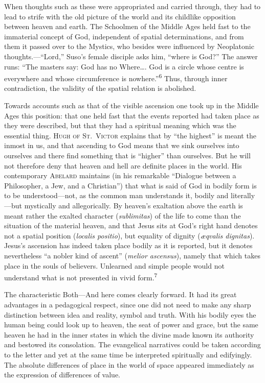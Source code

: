 \documentclass[12pt,a4paper]{book}
\newcommand{\opage}[1]{\marginnote{\footnotesize\textit{[#1]}}}
\begin{document}
When thoughts such as these were appropriated and carried through, they had
to lead to strife with the old picture of the world and its childlike
opposition between heaven and earth. The Schoolmen of the Middle Ages held
fast to the immaterial concept of God, independent of spatial determinations,
and from them it passed over to the Mystics, who besides were influenced by
Neoplatonic thoughts.---``Lord,'' Suso's female disciple asks him, ``where is
God?'' The answer runs: ``The masters say: God has no Where\ldots. God is a
circle whose centre is everywhere and whose circumference is
nowhere.''\textsuperscript{6} Thus, through inner contradiction, the validity
of the spatial relation is abolished.

Towards accounts such as that of the visible ascension one took up in the
Middle Ages this position: that one held fast that the events reported had
taken place as they were described, but that they had a spiritual meaning
which was the essential thing. \textsc{Hugh of St.\ Victor} explains that by
``the highest'' is meant the inmost in us, and that ascending to God means
that we sink ourselves into ourselves and there find something that is
``higher'' than ourselves. But he will not therefore deny that heaven and hell
are definite places in the world. His contemporary \textsc{Abelard} maintains
(in his remarkable ``Dialogue between a Philosopher, a Jew, and a Christian'')
that what is said of God in bodily form is to be understood---not, as the
common man understands it, bodily and literally---but mystically and
allegorically. By heaven's exaltation above the earth is meant rather the
exalted character (\textit{sublimitas}) of the life to come than the situation
of the material heaven, and that Jesus sits at God's right hand denotes not a
spatial position (\textit{localis positio}), but equality of dignity
(\textit{æqvalis dignitas}). Jesus's ascension has indeed taken place bodily
as it is reported, but it denotes nevertheless ``a nobler kind of ascent''
(\textit{melior ascensus}), namely that which takes place in 
\opage{28}the souls of
believers. Unlearned and simple people would not understand what is not
presented in vivid form.\textsuperscript{7}

The characteristic Both---And here comes clearly forward. It had its great
advantages in a pedagogical respect, since one did not need to make any sharp
distinction between idea and reality, symbol and truth. With his bodily eyes
the human being could look up to heaven, the seat of power and grace, but the
same heaven he had in the inner states in which the divine made known its
authority and bestowed its consolation. The evangelical narratives could be
taken according to the letter and yet at the same time be interpreted
spiritually and edifyingly. The absolute differences of place in the world of
space appeared immediately as the expression of differences of value.
\end{document}
